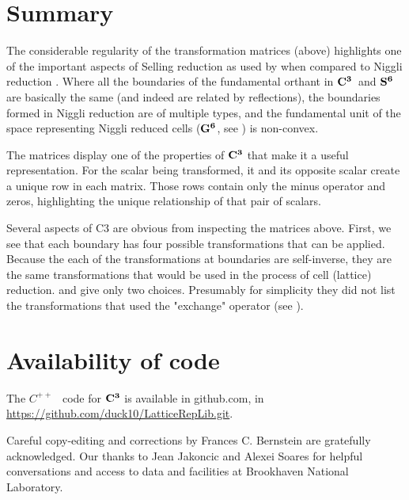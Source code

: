 \documentclass[]{iucr}              %
\numberwithin{equation}{section}
\newcommand{\SVI}[0]{$\bf{S^{6}}$}
\newcommand{\GVI}[0]{$\bf{G^{6}}$}
\newcommand{\CIII}[0]{$\bf{C^{3}}$}
\begin{document}
\section{Summary}

The considerable regularity of the transformation matrices (above) highlights one
of the important aspects of Selling reduction as used by 
when compared to Niggli reduction \cite{Niggli1928}. Where all the 
boundaries of the fundamental orthant in \CIII ~and \SVI{} are basically the same (and indeed are 
related by reflections), the boundaries formed in Niggli reduction
are of multiple types, and the fundamental unit of the space
representing Niggli reduced cells (\GVI{}, see ) is non-convex.

The matrices display one of the properties of \CIII{} that make it a
useful representation. For the scalar being transformed, it and its 
opposite scalar create a unique row in each matrix. Those rows contain
only the minus operator and zeros, highlighting the unique relationship
of that pair of scalars.

Several aspects of C3 are obvious from inspecting the matrices above. 
First, we see that each boundary has four possible 
transformations that
can be applied. Because the each of the transformations at boundaries are 
self-inverse, they are the same transformations that would 
be used in the process of cell (lattice) reduction. 
 and   give 
only two choices. Presumably for simplicity they did not list
the transformations that used the "exchange" operator 
(see \cite{andrews2019b}).





\section{Availability of code}

The $C^{++}$ ~code for \CIII{} is available in github.com, in
\url{https://github.com/duck10/LatticeRepLib.git}.




Careful copy-editing and corrections by Frances C. Bernstein are 
gratefully acknowledged.	Our thanks to Jean Jakoncic and Alexei Soares for 
helpful conversations and access to data and facilities at 
Brookhaven National Laboratory.
\end{document}
